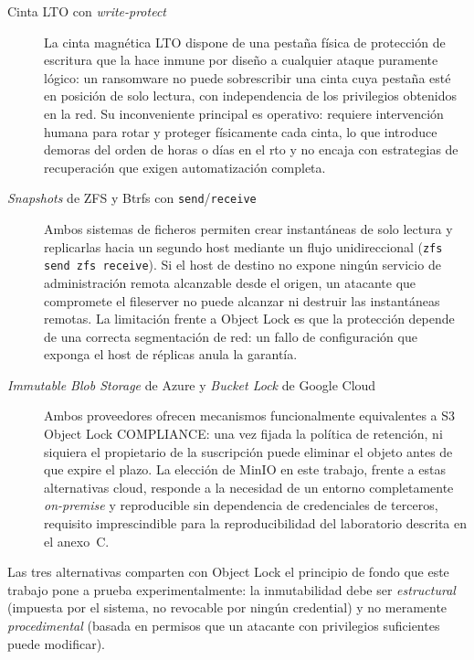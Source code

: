 \documentclass[../main.tex]{subfiles}
\begin{document}
\begin{description}
  \item[Cinta LTO con \textit{write-protect}] La cinta magnética LTO
  dispone de una pestaña física de protección de escritura que la hace
  inmune por diseño a cualquier ataque puramente lógico: un ransomware no
  puede sobrescribir una cinta cuya pestaña esté en posición de solo
  lectura, con independencia de los privilegios obtenidos en la red. Su
  inconveniente principal es operativo: requiere intervención humana para
  rotar y proteger físicamente cada cinta, lo que introduce demoras del
  orden de horas o días en el \gls{rto} y no encaja con estrategias de
  recuperación que exigen automatización completa.

  \item[\textit{Snapshots} de ZFS y Btrfs con \texttt{send}/\texttt{receive}]
  Ambos sistemas de ficheros permiten crear instantáneas de solo lectura y
  replicarlas hacia un segundo host mediante un flujo unidireccional
  (\texttt{zfs send \textbar{} zfs receive}). Si el host de destino no
  expone ningún servicio de administración remota alcanzable desde el
  origen, un atacante que compromete el fileserver no puede alcanzar ni
  destruir las instantáneas remotas. La limitación frente a Object Lock es
  que la protección depende de una correcta segmentación de red: un fallo
  de configuración que exponga el host de réplicas anula la garantía.

  \item[\textit{Immutable Blob Storage} de Azure y \textit{Bucket Lock} de
  Google Cloud] Ambos proveedores ofrecen mecanismos funcionalmente
  equivalentes a S3 Object Lock COMPLIANCE: una vez fijada la política de
  retención, ni siquiera el propietario de la suscripción puede eliminar
  el objeto antes de que expire el plazo. La elección de MinIO en este
  trabajo, frente a estas alternativas cloud, responde a la necesidad de
  un entorno completamente \textit{on-premise} y reproducible sin
  dependencia de credenciales de terceros, requisito imprescindible para
  la reproducibilidad del laboratorio descrita en el anexo~C.
\end{description}

Las tres alternativas comparten con Object Lock el principio de fondo que
este trabajo pone a prueba experimentalmente: la inmutabilidad debe ser
\emph{estructural} (impuesta por el sistema, no revocable por ningún
credential) y no meramente \emph{procedimental} (basada en permisos que un
atacante con privilegios suficientes puede modificar).
\end{document}

